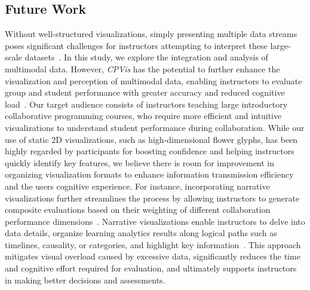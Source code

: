 {\subsection{Future Work}
Without well-structured visualizations, simply presenting multiple data streams poses significant challenges for instructors attempting to interpret these large-scale datasets~\cite{fernandez2024data}.
In this study, we explore the integration and analysis of multimodal data. However, \textit{CPVis} has the potential to further enhance the visualization and perception of multimodal data, enabling instructors to evaluate group and student performance with greater accuracy and reduced cognitive load~\cite{martinez2020data}. 
Our target audience consists of instructors teaching large introductory collaborative programming courses, who require more efficient and intuitive visualizations to understand student performance during collaboration.  
While our use of static 2D visualizations, such as high-dimensional flower glyphs, has been highly regarded by participants for boosting confidence and helping instructors quickly identify key features, we believe there is room for improvement in organizing visualization formats to enhance information transmission efficiency and the users cognitive experience.
For instance, incorporating narrative visualizations further streamlines the process by allowing instructors to generate composite evaluations based on their weighting of different collaboration performance dimensions~\cite{gratzl2013lineup}. 
Narrative visualizations enable instructors to delve into data details, organize learning analytics results along logical paths such as timelines, causality, or categories, and highlight key information~\cite{chen2019designing}. 
This approach mitigates visual overload caused by excessive data, significantly reduces the time and cognitive effort required for evaluation, and ultimately supports instructors in making better decisions and assessments.

}
